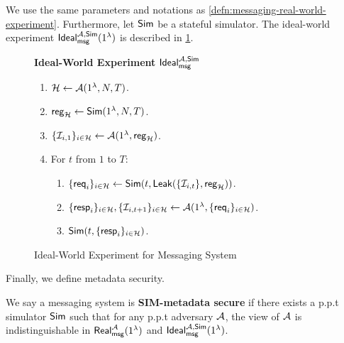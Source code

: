 \begin{definition}
\label{defn:messaging-ideal-world-experiment}
We use the same parameters and notations as \cref{defn:messaging-real-world-experiment}. Furthermore, let $\mathsf{Sim}$ be a stateful simulator. The ideal-world experiment $\mathsf{Ideal}_{\mathsf{msg}}^{\mathcal{A}, \mathsf{Sim}}(1^{\lambda})$ is described in \cref{expr:messaging-ideal-world}.
\begin{figure}[h]
\begin{framed}
\textbf{Ideal-World Experiment }$\mathsf{Ideal}_{\mathsf{msg}}^{\mathcal{A}, \mathsf{Sim}}$
\begin{enumerate}
\item $\mathcal{H} \leftarrow \mathcal{A}(1^{\lambda}, N, T)$.
\item $\mathsf{reg}_{\mathcal{H}} \leftarrow \mathsf{Sim}(1^{\lambda}, N, T)$. 
\item $\{\mathcal{I}_{i, 1}\}_{i \in \mathcal{H}} \leftarrow \mathcal{A}(1^{\lambda}, \mathsf{reg}_{\mathcal{H}})$.
\item For $t$ from $1$ to $T$:
    \begin{enumerate}
    \item  $\{\mathsf{req}_i\}_{i \in \mathcal{H}} \leftarrow \mathsf{Sim}(t, \mathsf{Leak}(\{\mathcal{I}_{i, t}\}, \mathsf{reg}_{\mathcal{H}}))$.
    
    \item $\{\mathsf{resp}_i\}_{i \in \mathcal{H}}, \{\mathcal{I}_{i, t + 1}\}_{i \in \mathcal{H}} \leftarrow \mathcal{A}(1^{\lambda}, \{\mathsf{req}_i\}_{i \in \mathcal{H}})$.
    
    \item $\mathsf{Sim}(t, \{\mathsf{resp}_i\}_{i \in \mathcal{H}})$.
    \end{enumerate}
\end{enumerate}
\end{framed}
\caption{Ideal-World Experiment for Messaging System}
\label{expr:messaging-ideal-world}
\end{figure}

\end{definition}

Finally, we define metadata security.

\begin{definition}
\label{defn:messaging-security}
We say a messaging system is \textbf{SIM-metadata secure} if there exists a p.p.t simulator $\mathsf{Sim}$ such that for any p.p.t adversary $\mathcal{A}$, the view of $\mathcal{A}$ is indistinguishable in $\mathsf{Real}_{\mathsf{msg}}^{\mathcal{A}}(1^{\lambda})$ and $\mathsf{Ideal}^{\mathcal{A}, \mathsf{\mathsf{Sim}}}_{\mathsf{msg}}(1^{\lambda})$.
\end{definition}


